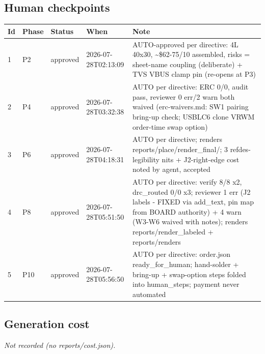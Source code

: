 \documentclass[11pt,a4paper]{article}
\begin{document}
\subsection*{Human checkpoints}
{\small
\begin{longtable}{lllp{2.6cm}p{6.4cm}}
\toprule
\textbf{Id} & \textbf{Phase} & \textbf{Status} & \textbf{When} & \textbf{Note} \\
\midrule
\endhead
1 & P2 & approved & 2026-07-28T02:13:09 & AUTO-approved per directive: 4L 40x30, \textasciitilde{}\$62-75/10 assembled, risks = sheet-name coupling (deliberate) + TVS VBUS clamp pin (re-opens at P3) \\
2 & P4 & approved & 2026-07-28T03:32:38 & AUTO per directive: ERC 0/0, audit pass, reviewer 0 err/2 warn both waived (erc-waivers.md: SW1 pairing bring-up check; USBLC6 clone VRWM order-time swap option) \\
3 & P6 & approved & 2026-07-28T04:18:31 & AUTO per directive; renders reports/place/render\_final/; 3 refdes-legibility nits + J2-right-edge cost noted by agent, accepted \\
4 & P8 & approved & 2026-07-28T05:51:50 & AUTO per directive: verify 8/8 x2, drc\_routed 0/0 x3; reviewer 1 err (J2 labels - FIXED via add\_text, pin map from BOARD authority) + 4 warn (W3-W6 waived with notes); renders reports/render\_labeled + reports/renders \\
5 & P10 & approved & 2026-07-28T05:56:50 & AUTO per directive: order.json ready\_for\_human; hand-solder + bring-up + swap-option steps folded into human\_steps; payment never automated \\
\bottomrule
\end{longtable}
}
\subsection*{Generation cost}
\emph{Not recorded (no reports/cost.json).}
\end{document}
